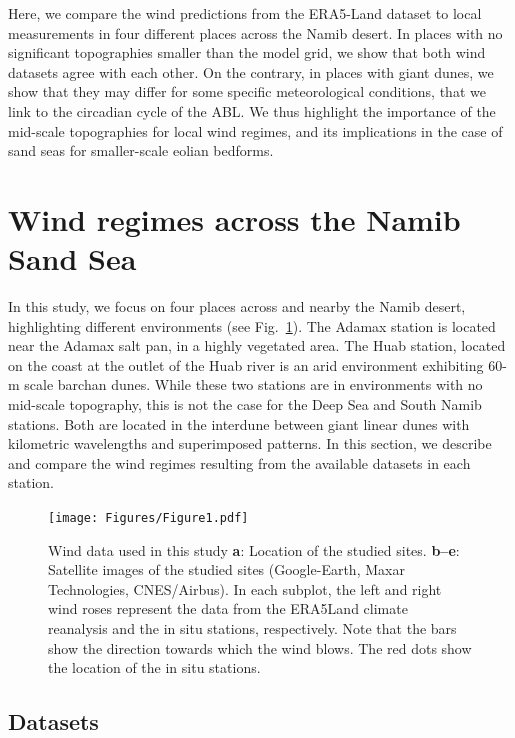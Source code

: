 Here, we compare the wind predictions from the ERA5-Land dataset to local measurements in four different places across the Namib desert. In places with no significant topographies smaller than the model grid, we show that both wind datasets agree with each other. On the contrary, in places with giant dunes, we show that they may differ for some specific meteorological conditions, that we link to the circadian cycle of the ABL. We thus highlight the importance of the mid-scale topographies for local wind regimes, and its implications in the case of sand seas for smaller-scale eolian bedforms.


\section{Wind regimes across the Namib Sand Sea}

In this study, we focus on four places across and nearby the Namib desert, highlighting different environments (see Fig.~\ref{Fig1}).
%
The Adamax station is located near the Adamax salt pan, in a highly vegetated area. The Huab station, located on the coast at the outlet of the Huab river is an arid environment exhibiting $60$-m scale barchan dunes. While these two stations are in environments with no mid-scale topography, this is not the case for the Deep Sea and South Namib stations. Both are located in the interdune between giant linear dunes with kilometric wavelengths and superimposed patterns. In this section, we describe and compare the wind regimes resulting from the available datasets in each station.

  \begin{figure}
    \centering
    \texttt{[image: Figures/Figure1.pdf]}
    \caption{Wind data used in this study \textbf{a}: Location of the studied sites. \textbf{b--e}: Satellite images of the studied sites (Google-Earth, Maxar Technologies, CNES/Airbus). In each subplot, the left and right wind roses represent the data from the ERA5Land climate reanalysis and the in situ stations, respectively. Note that the bars show the direction towards which the wind blows. The red dots show the location of the in situ stations.}
    \label{Fig1}
  \end{figure}

  \subsection{Datasets}

